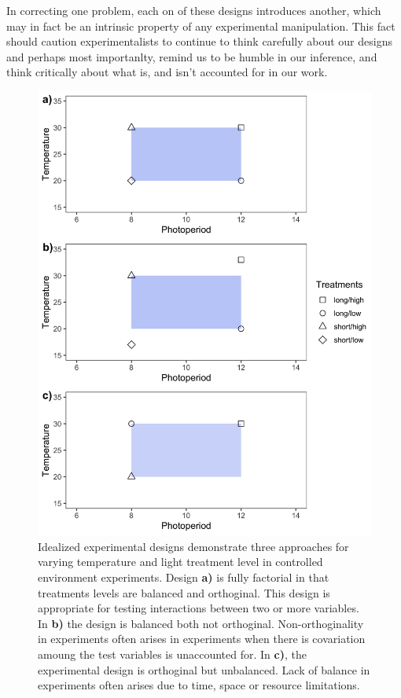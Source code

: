 \documentclass[11pt]{article}
\begin{document}
In correcting one problem, each on of these designs introduces another, which may in fact be an intrinsic property of any experimental manipulation. This fact should caution experimentalists to continue to think carefully about our designs and perhaps most importanlty, remind us to be humble in our inference, and think critically about what is, and isn't accounted for in our work. 


\begin{figure}[h!]
    \centering
 \includegraphics[width=.9\textwidth]{..//Plots/periodicity_figures/orthog.jpeg}
    \caption{Idealized experimental designs demonstrate three approaches for varying temperature and light treatment level in controlled environment experiments. Design \textbf{a)} is fully factorial in that treatments levels are balanced and orthoginal. This design is appropriate for testing interactions between two or more variables. In \textbf{b)} the design is balanced both not orthoginal. Non-orthoginality in experiments often arises in experiments when there is covariation amoung the test variables is unaccounted for. In \textbf{c)}, the experimental design is orthoginal but unbalanced. Lack of balance in experiments often arises due to time, space or resource limitations. }
    \label{fig:examp}
\end{figure}
\end{document}
